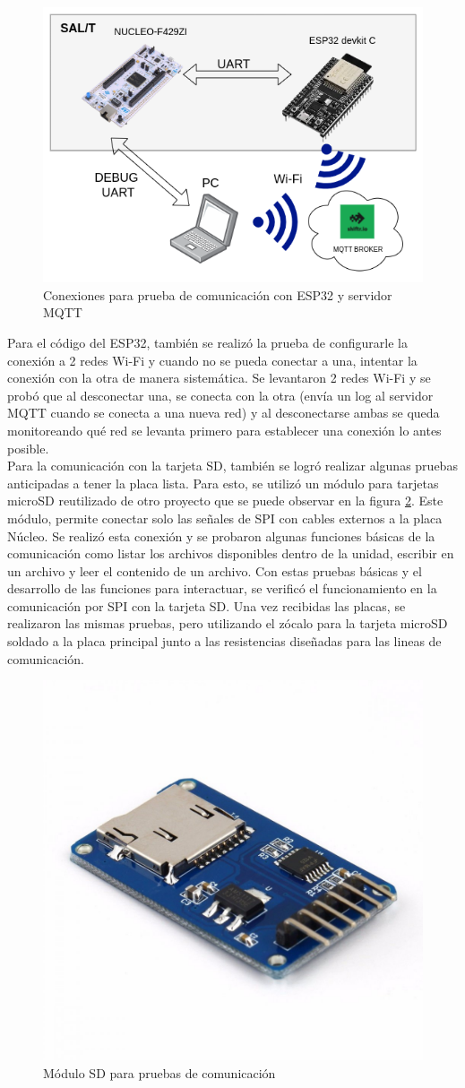 \begin{figure}[H]
    \centering
    \includegraphics[width = 0.7\linewidth]{img/mqtt_testbench.png}
    \caption{Conexiones para prueba de comunicación con ESP32 y servidor MQTT}
    \label{fig:mqtt_testbench}
\end{figure}

Para el código del ESP32, también se realizó la prueba de configurarle la conexión a 2 redes Wi-Fi y cuando no se pueda conectar a una, intentar la conexión con la otra de manera sistemática. Se levantaron 2 redes Wi-Fi y se probó que al desconectar una, se conecta con la otra (envía un log al servidor MQTT cuando se conecta a una nueva red) y al desconectarse ambas se queda monitoreando qué red se levanta primero para establecer una conexión lo antes posible. \\ 

Para la comunicación con la tarjeta SD, también se logró realizar algunas pruebas anticipadas a tener la placa lista. Para esto, se utilizó un módulo para tarjetas microSD \cite{modulo_sd} reutilizado de otro proyecto que se puede observar en la figura \ref{fig:modulo_sd}. Este módulo, permite conectar solo las señales de SPI con cables externos a la placa Núcleo. Se realizó esta conexión y se probaron algunas funciones básicas de la comunicación como listar los archivos disponibles dentro de la unidad, escribir en un archivo y leer el contenido de un archivo. Con estas pruebas básicas y el desarrollo de las funciones para interactuar, se verificó el funcionamiento en la comunicación por SPI con la tarjeta SD. Una vez recibidas las placas, se realizaron las mismas pruebas, pero utilizando el zócalo para la tarjeta microSD soldado a la placa principal junto a las resistencias diseñadas para las lineas de comunicación. 

\begin{figure}[H]
    \centering
    \includegraphics[width = 0.4\linewidth]{img/modulo_sd.jpg}
    \caption{Módulo SD para pruebas de comunicación}
    \label{fig:modulo_sd}
\end{figure}

